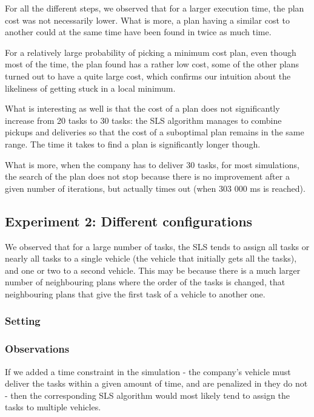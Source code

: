 \documentclass[10pt]{article}
\begin{document}
For all the different steps, we observed that for a larger execution time, the plan cost was not necessarily lower.
What is more, a plan having a similar cost to another could at the same time have been found in twice as much time.

For a relatively large probability of picking a minimum cost plan, even though most of the time, the plan found has a rather low cost, some of the other plans turned out to have a quite large cost, which confirms our intuition about the likeliness of getting stuck in a local minimum. 

What is interesting as well is that the cost of a plan does not significantly increase from 20 tasks to 30 tasks: the SLS algorithm manages to combine pickups and deliveries so that the cost of a suboptimal plan remains in the same range.
The time it takes to find a plan is significantly longer though.

What is more, when the company has to deliver 30 tasks, for most simulations, the search of the plan does not stop because there is no improvement after a given number of iterations, but actually times out (when 303 000 ms is reached).

\subsection{Experiment 2: Different configurations}

We observed that for a large number of tasks, the SLS tends to assign all tasks or nearly all tasks to a single vehicle (the vehicle that initially gets all the tasks), and one or two to a second vehicle.
This may be because there is a much larger number of neighbouring plans where the order of the tasks is changed, that neighbouring plans that give the first task of a vehicle to another one. 

\subsubsection{Setting}

\subsubsection{Observations}


If we added a time constraint in the simulation - the company's vehicle must deliver the tasks within a given amount of time, and are penalized in they do not - then the corresponding SLS algorithm would most likely tend to assign the tasks to multiple vehicles.
\end{document}
